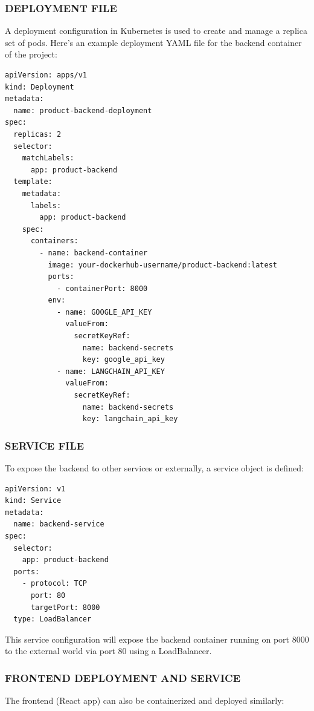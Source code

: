 \documentclass[12pt]{report}
\begin{document}
\subsubsection{DEPLOYMENT FILE}

A deployment configuration in Kubernetes is used to create and manage a replica set of pods. Here's an example deployment YAML file for the backend container of the project:

\begin{verbatim}
apiVersion: apps/v1
kind: Deployment
metadata:
  name: product-backend-deployment
spec:
  replicas: 2
  selector:
    matchLabels:
      app: product-backend
  template:
    metadata:
      labels:
        app: product-backend
    spec:
      containers:
        - name: backend-container
          image: your-dockerhub-username/product-backend:latest
          ports:
            - containerPort: 8000
          env:
            - name: GOOGLE_API_KEY
              valueFrom:
                secretKeyRef:
                  name: backend-secrets
                  key: google_api_key
            - name: LANGCHAIN_API_KEY
              valueFrom:
                secretKeyRef:
                  name: backend-secrets
                  key: langchain_api_key
\end{verbatim}

\subsubsection{SERVICE FILE}

To expose the backend to other services or externally, a service object is defined:

\begin{verbatim}
apiVersion: v1
kind: Service
metadata:
  name: backend-service
spec:
  selector:
    app: product-backend
  ports:
    - protocol: TCP
      port: 80
      targetPort: 8000
  type: LoadBalancer
\end{verbatim}

This service configuration will expose the backend container running on port 8000 to the external world via port 80 using a LoadBalancer.

\subsubsection{FRONTEND DEPLOYMENT AND SERVICE}

The frontend (React app) can also be containerized and deployed similarly:
\end{document}
